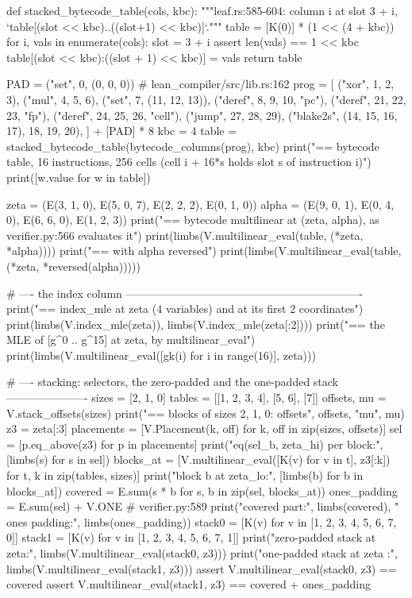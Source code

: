 \begin{srccode}
def stacked_bytecode_table(cols, kbc):
    """leaf.rs:585-604: column i at slot 3 + i, `table[(slot << kbc)..((slot+1) << kbc)]`."""
    table = [K(0)] * (1 << (4 + kbc))
    for i, vals in enumerate(cols):
        slot = 3 + i
        assert len(vals) == 1 << kbc
        table[(slot << kbc):((slot + 1) << kbc)] = vals
    return table


PAD = ("set", 0, (0, 0, 0))  # lean_compiler/src/lib.rs:162
prog = [
    ("xor", 1, 2, 3),
    ("mul", 4, 5, 6),
    ("set", 7, (11, 12, 13)),
    ("deref", 8, 9, 10, "pc"),
    ("deref", 21, 22, 23, "fp"),
    ("deref", 24, 25, 26, "cell"),
    ("jump", 27, 28, 29),
    ("blake2s", (14, 15, 16, 17), 18, 19, 20),
] + [PAD] * 8
kbc = 4
table = stacked_bytecode_table(bytecode_columns(prog), kbc)
print("== bytecode table, 16 instructions, 256 cells (cell i + 16*s holds slot s of instruction i)")
print([w.value for w in table])

zeta = (E(3, 1, 0), E(5, 0, 7), E(2, 2, 2), E(0, 1, 0))
alpha = (E(9, 0, 1), E(0, 4, 0), E(6, 6, 0), E(1, 2, 3))
print("== bytecode multilinear at (zeta, alpha), as verifier.py:566 evaluates it")
print(limbs(V.multilinear_eval(table, (*zeta, *alpha))))
print("== with alpha reversed")
print(limbs(V.multilinear_eval(table, (*zeta, *reversed(alpha)))))

# ---- the index column ----------------------------------------------------------------
print("== index_mle at zeta (4 variables) and at its first 2 coordinates")
print(limbs(V.index_mle(zeta)), limbs(V.index_mle(zeta[:2])))
print("== the MLE of [g^0 .. g^15] at zeta, by multilinear_eval")
print(limbs(V.multilinear_eval([gk(i) for i in range(16)], zeta)))

# ---- stacking: selectors, the zero-padded and the one-padded stack ----------------------
sizes = [2, 1, 0]
tables = [[1, 2, 3, 4], [5, 6], [7]]
offsets, mu = V.stack_offsets(sizes)
print("== blocks of sizes 2, 1, 0: offsets", offsets, "mu", mu)
z3 = zeta[:3]
placements = [V.Placement(k, off) for k, off in zip(sizes, offsets)]
sel = [p.eq_above(z3) for p in placements]
print("eq(sel_b, zeta_hi) per block:", [limbs(s) for s in sel])
blocks_at = [V.multilinear_eval([K(v) for v in t], z3[:k]) for t, k in zip(tables, sizes)]
print("block b at zeta_lo:", [limbs(b) for b in blocks_at])
covered = E.sum(s * b for s, b in zip(sel, blocks_at))
ones_padding = E.sum(sel) + V.ONE  # verifier.py:589
print("covered part:", limbs(covered), " ones padding:", limbs(ones_padding))
stack0 = [K(v) for v in [1, 2, 3, 4, 5, 6, 7, 0]]
stack1 = [K(v) for v in [1, 2, 3, 4, 5, 6, 7, 1]]
print("zero-padded stack at zeta:", limbs(V.multilinear_eval(stack0, z3)))
print("one-padded stack at zeta :", limbs(V.multilinear_eval(stack1, z3)))
assert V.multilinear_eval(stack0, z3) == covered
assert V.multilinear_eval(stack1, z3) == covered + ones_padding


\end{srccode}
